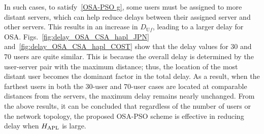 \documentclass[10pt, letterpaper]{IEEEtran}
\begin{document}
\begin{CJK}{UTF8}{ipxm}
{In such cases, to satisfy~\eqref{OSA-PSO g}, some users must be assigned to more distant servers, which can help reduce delays between their assigned server and other servers.
This results in an increase in $D_{\mathrm{U}f}$, leading to a larger delay for OSA.
Figs.~\ref{fig:delay_OSA_CSA_hapl_JPN} and~\ref{fig:delay_OSA_CSA_hapl_COST} show that the delay values for 30 and 70 users are quite similar.
This is because the overall delay is determined by the user-server pair with the maximum distance; thus, the location of the most distant user becomes the dominant factor in the total delay.
As a result, when the farthest users in both the 30-user and 70-user cases are located at comparable distances from the servers, the maximum delay remains nearly unchanged.
From the above results, it can be concluded that regardless of the number of users or the network topology, the proposed OSA-PSO scheme is effective in reducing delay when $H_{\rm APL}$ is large.
}


\end{CJK}
\end{document}
